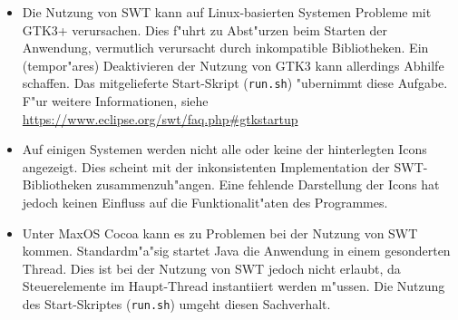 \documentclass{proc}
\begin{document}
	\begin{itemize}
		\item Die Nutzung von SWT kann auf Linux-basierten Systemen Probleme mit GTK3+ verursachen.
		Dies f"uhrt zu Abst"urzen beim Starten der Anwendung, vermutlich verursacht durch inkompatible Bibliotheken.
		Ein (tempor"ares) Deaktivieren der Nutzung von GTK3 kann allerdings Abhilfe schaffen.
		Das mitgelieferte Start-Skript (\texttt{run.sh}) "ubernimmt diese Aufgabe.
		F"ur weitere Informationen, siehe \url{https://www.eclipse.org/swt/faq.php\#gtkstartup}
		\item Auf einigen Systemen werden nicht alle oder keine der hinterlegten Icons angezeigt.
		Dies scheint mit der inkonsistenten Implementation der SWT-Bibliotheken zusammenzuh"angen.
		Eine fehlende Darstellung der Icons hat jedoch keinen Einfluss auf die Funktionalit"aten des Programmes.
		\item Unter MaxOS Cocoa kann es zu Problemen bei der Nutzung von SWT kommen. Standardm"a"sig startet Java die Anwendung in einem gesonderten Thread. Dies ist bei der Nutzung von SWT jedoch nicht erlaubt, da Steuerelemente im Haupt-Thread instantiiert werden m"ussen. Die Nutzung des Start-Skriptes (\texttt{run.sh}) umgeht diesen Sachverhalt.
	\end{itemize}
		
\end{document}
